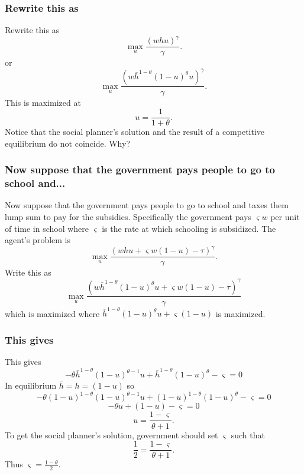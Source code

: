 \documentclass[aspectratio=169]{ltx-talk}
\begin{document}
\begin{frame}
\frametitle{Rewrite this as}
Rewrite this as%
\begin{equation*}
\underset{u}{\max }\frac{\left( whu\right) ^{\gamma }}{\gamma }.
\end{equation*}%
or%
\begin{equation*}
\underset{u}{\max }\frac{\left( w\overline{h}^{1-\theta }(1-u)^{\theta
}u\right) ^{\gamma }}{\gamma }.
\end{equation*}%
This is maximized at 
\begin{equation*}
u=\frac{1}{1+\theta }.
\end{equation*}%
Notice that the social planner's solution and the result of a competitive
equilibrium do not coincide. Why?
\end{frame}

\begin{frame}
\frametitle{Now suppose that the government pays people to go to school and...}
Now suppose that the government pays people to go to school and taxes them
lump sum to pay for the subsidies. Specifically the government pays $%
\varsigma w$ per unit of time in school where $\varsigma $ is the rate at
which schooling is subsidized$.$ The agent's problem is 
\begin{equation*}
\underset{u}{\max }\frac{\left( whu+\varsigma w(1-u)-\tau \right) ^{\gamma }%
}{\gamma }.
\end{equation*}%
Write this as%
\begin{equation*}
\underset{u}{\max }\frac{\left( w\overline{h}^{1-\theta }(1-u)^{\theta
}u+\varsigma w(1-u)-\tau \right) ^{\gamma }}{\gamma }
\end{equation*}%
which is maximized where $\overline{h}^{1-\theta }(1-u)^{\theta }u+\varsigma
(1-u)$ is maximized.
\end{frame}

\begin{frame}
\frametitle{This gives}
This gives%
\begin{equation*}
-\theta \overline{h}^{1-\theta }(1-u)^{\theta -1}u+\overline{h}^{1-\theta
}(1-u)^{\theta }-\varsigma =0
\end{equation*}%
In equilibrium $\overline{h}=h=(1-u)$ so 
\begin{equation*}
-\theta \left( 1-u\right) ^{1-\theta }(1-u)^{\theta -1}u+(1-u)^{1-\theta
}(1-u)^{\theta }-\varsigma =0
\end{equation*}%
\begin{equation*}
-\theta u+(1-u)-\varsigma =0
\end{equation*}%
\begin{equation*}
u=\frac{1-\varsigma }{\theta +1}.
\end{equation*}%
$\allowbreak \allowbreak $To get the social planner's solution, government
should set $\varsigma $ such that 
\begin{equation*}
\frac{1}{2}=\frac{1-\varsigma }{\theta +1}.
\end{equation*}%
Thus $\varsigma =\frac{1-\theta }{2}.$
\end{frame}
\end{document}
